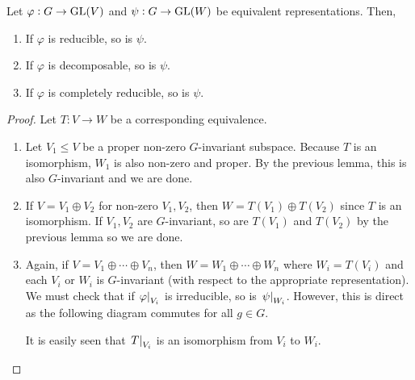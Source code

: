 			\begin{flem}
				\label{equivalence preserves reducibility}
				Let $\varphi : G \to \operatorname{GL}(V)$ and $\psi : G \to \operatorname{GL}(W)$ be equivalent representations. Then,
				\begin{enumerate}
					\item If $\varphi$ is reducible, so is $\psi$.
					\item If $\varphi$ is decomposable, so is $\psi$.
					\item If $\varphi$ is completely reducible, so is $\psi$.
				\end{enumerate}
			\end{flem}
			\begin{proof}
				Let $T : V \to W$ be a corresponding equivalence.
				\begin{enumerate}
					\item Let $V_1 \le V$ be a proper non-zero $G$-invariant subspace. Because $T$ is an isomorphism, $W_1$ is also non-zero and proper. By the previous lemma, this is also $G$-invariant and we are done.
					\item If $V = V_1 \oplus V_2$ for non-zero $V_1,V_2$, then $W = T(V_1) \oplus T(V_2)$ since $T$ is an isomorphism. If $V_1,V_2$ are $G$-invariant, so are $T(V_1)$ and $T(V_2)$ by the previous lemma so we are done.
					\item Again, if $V = V_1 \oplus \cdots \oplus V_n$, then $W = W_1 \oplus \cdots \oplus W_n$ where $W_i = T(V_i)$ and each $V_i$ or $W_i$ is $G$-invariant (with respect to the appropriate representation).\\
					We must check that if $\left.\varphi\right|_{V_i}$ is irreducible, so is $\left.\psi\right|_{W_i}$. However, this is direct as the following diagram commutes for all $g \in G$.
					\begin{center}
					\end{center}
					It is easily seen that $\left.T\right|_{V_i}$ is an isomorphism from $V_i$ to $W_i$. \qedhere
				\end{enumerate}
			\end{proof}

